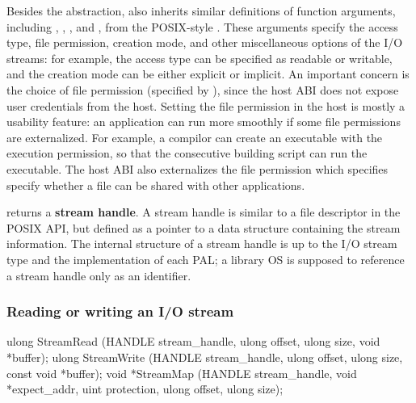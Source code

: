 Besides the abstraction,
also inherits similar definitions of function arguments,
including , , , and ,
from the POSIX-style .
These arguments specify the access type, file permission, creation mode, and other miscellaneous options of the I/O streams:
for example, the access type can be specified as readable or writable,
and the creation mode can be either explicit or implicit.
An important concern is the choice of file permission (specified by ), since the host ABI does not expose user credentials
from the host.
Setting the file permission in the host
is mostly a usability feature: 
an application can run more smoothly if some file permissions are externalized.
For example, a compilor can create an executable with the execution permission, so that the consecutive building script can run the executable.
The host ABI also externalizes the file permission
which specifies specify whether a file can be shared with other applications.


 returns a {\bf stream handle}. A stream handle is similar to a file descriptor in the POSIX API,
but defined as a pointer to a data structure containing the stream information.
The internal structure of a stream handle is up to the I/O stream type and the implementation of each PAL;
a library OS is supposed to reference a stream handle
only as an identifier.




\subsubsection*{Reading or writing an I/O stream}



\begin{paldef}
ulong StreamRead  (HANDLE stream_handle, ulong offset,
                   ulong size, void *buffer);
ulong StreamWrite (HANDLE stream_handle, ulong offset,
                   ulong size, const void *buffer);
void *StreamMap   (HANDLE stream_handle,
                   void *expect_addr, uint protection,
                   ulong offset, ulong size);
\end{paldef}



